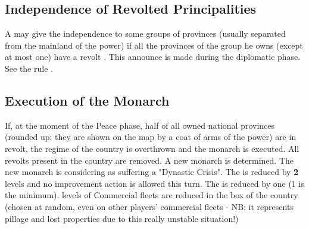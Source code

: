 


\subsection{Independence of Revolted Principalities}\label{chRedep:Peace:Independence Revolt}
A \MAJ may give the independence to some groups of provinces (usually
separated from the mainland of the power) if all the provinces of the group he
owns (except at most one) have a revolt \Facemoins.  This announce is made
during the diplomatic phase.  See the rule
.


\subsection{Execution of the
  Monarch}\label{chRedep:ExecutionMonarchByRevolts}
\aparag If, at the moment of the Peace phase, half of all owned national
provinces (rounded up; they are shown on the map by a coat of arms of the
power) are in revolt, the regime of the country is overthrown and the monarch
is executed.
\aparag[Consequences]
All revolts present in the country are removed. A new monarch is
determined. The new monarch is considering as suffering a "Dynastic Crisis".
\bparag The \STAB is reduced by \textbf{2} levels%
and no \STAB improvement action is allowed this turn.
\bparag The \DTI is reduced by one (1 is the minimum).
 levels of Commercial fleets are reduced in the \CTZ box of the
country (chosen at random, even on other players' commercial fleets - NB: it
represents pillage and lost properties due to this really unstable situation!)



